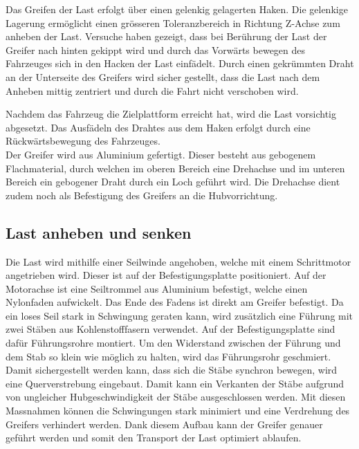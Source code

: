 \documentclass[a4paper]{report}
\begin{document}
Das Greifen der Last erfolgt über einen gelenkig gelagerten Haken. Die gelenkige Lagerung ermöglicht einen grösseren Toleranzbereich in Richtung Z-Achse zum anheben der Last. Versuche haben gezeigt, dass bei Berührung der Last der Greifer nach hinten gekippt wird und durch das Vorwärts bewegen des Fahrzeuges sich in den Hacken der Last einfädelt. Durch einen gekrümmten Draht an der Unterseite des Greifers wird sicher gestellt, dass die Last nach dem Anheben mittig zentriert und durch die Fahrt nicht verschoben wird.

Nachdem das Fahrzeug die Zielplattform erreicht hat, wird die Last vorsichtig abgesetzt. Das Ausfädeln des Drahtes aus dem Haken erfolgt durch eine Rückwärtsbewegung des Fahrzeuges.\\
Der Greifer wird aus Aluminium gefertigt. Dieser besteht aus gebogenem Flachmaterial, durch welchen im oberen Bereich eine Drehachse und im unteren Bereich ein gebogener Draht durch ein Loch geführt wird. Die Drehachse dient zudem noch als Befestigung des Greifers an die Hubvorrichtung.

\subsection{Last anheben und senken}
Die Last wird mithilfe einer Seilwinde angehoben, welche mit einem Schrittmotor angetrieben wird. Dieser ist auf der Befestigungsplatte positioniert. Auf der Motorachse ist eine Seiltrommel aus Aluminium befestigt, welche einen Nylonfaden aufwickelt. Das Ende des Fadens ist direkt am Greifer befestigt. Da ein loses Seil stark in Schwingung geraten kann, wird zusätzlich eine Führung mit zwei Stäben aus Kohlenstofffasern verwendet. Auf der Befestigungsplatte sind dafür Führungsrohre montiert. Um den Widerstand zwischen der Führung und dem Stab so klein wie möglich zu halten, wird das Führungsrohr geschmiert. Damit sichergestellt werden kann, dass sich die Stäbe synchron bewegen, wird eine Querverstrebung eingebaut. Damit kann ein Verkanten der Stäbe aufgrund von ungleicher Hubgeschwindigkeit der Stäbe ausgeschlossen werden. Mit diesen Massnahmen können die Schwingungen stark minimiert und eine Verdrehung des Greifers verhindert werden. Dank diesem Aufbau kann der Greifer genauer geführt werden und somit den Transport der Last optimiert ablaufen.

\newpage
\end{document}
